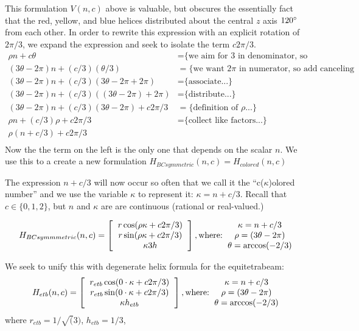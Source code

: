 \documentclass[11pt]{article}
\begin{document}
This formulation $V(n,c)$ above is valuable, but obscures the essentially fact that the red, yellow, and blue helices distributed
about the central $z$ axis $120\degree$ from each other.
In order to rewrite this expression with an explicit rotation of $2\pi/3$, we expand 
the expression and seek to isolate the term $c2\pi/3$.
\begin{align*}
  \rho n + c \theta  &=   \text{\{we aim for 3 in denominator, so we split...\}} \\
    (3 \theta - 2 \pi)n + (c/3)  (\theta /3)  &=   \text{\{we want $2\pi$ in numerator, so add canceling terms...\}} \\
  (3 \theta - 2 \pi)n + (c/ 3) (3 \theta - 2 \pi  + 2 \pi) &=  \text{\{associate...\}} \\
  (3 \theta - 2 \pi)n + (c/ 3) ((3 \theta - 2 \pi)  + 2 \pi) &=  \text{\{distribute...\}} \\  
  (3 \theta - 2 \pi)n + (c / 3) (3 \theta - 2 \pi)  + c 2 \pi /3 &=  \text{\{definition of $\rho$...\}} \\
  \rho n + (c / 3) \rho  + c 2 \pi /3 &=  \text{\{collect like factors...\}} \\  
  \rho (n + c/3)  + c 2 \pi /3  \\
\end{align*}
Now the the term on the left is the only one that depends on the scalar $n$. We use this to a create
a new formulation $H_{BCsymmetric}(n,c) = H_{colored}(n,c)$

The expression $n+c/3$ will now occur so often that we call it the ``c($\kappa$)olored number'' and we use the variable $\kappa$ to represent it: $\kappa = n+c/3$.
Recall that $c \in \{0,1,2\}$, but $n$ and $\kappa$ are are continuous (rational or real-valued.)

\[
H_{BCsymmmetric}(n,c) =
\left [
  \begin{tabular}{c}
   $ r  \cos(\rho \kappa  + c 2 \pi /3) $\\
   $ r  \sin(\rho \kappa  + c 2 \pi /3) $\\
   $ \kappa 3  h $
  \end{tabular}
  \right ],
\text{where:}
  \begin{tabular}{c}
 $\kappa = n + c/3$ \\
    $\rho = (3 \theta - 2 \pi)$ \\
   $ \theta = \arccos(-2/3) $
  \end{tabular}      
\]

We seek to unify this with degenerate helix formula for the equitetrabeam:
\[
H_{etb}(n,c) =
\left [
  \begin{tabular}{c}
   $ r_{etb}  \cos( 0 \cdot \kappa  + c 2 \pi /3) $\\
   $ r_{etb}  \sin( 0 \cdot \kappa  + c 2 \pi /3) $\\
   $ \kappa h_{etb} $
  \end{tabular}
\right ],
\text{where:}
  \begin{tabular}{c}
 $\kappa = n + c/3$ \\
    $\rho = (3 \theta - 2 \pi)$ \\
   $ \theta = \arccos(-2/3) $
  \end{tabular}      
\]
where $ r_{etb} = 1/\sqrt(3)$, $h_{etb} = 1/3$,
\end{document}
